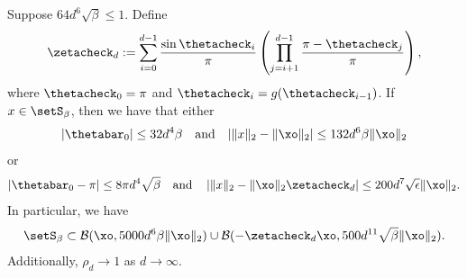 \begin{lemma} \label{lemma:Seps}
Suppose $64 d^6 \sqrt{\beta} \leq 1$. 
Define
\[
\zetacheck_d := \sum_{i=0}^{d-1} \frac{\sin \thetacheck_{i}}{\pi} \left( \prod_{j=i+1}^{d-1} \frac{\pi - \thetacheck_{j} }{\pi} \right),
\]
where $\thetacheck_0= \pi$ and $\thetacheck_i = g(\thetacheck_{i-1})$.  If $x \in \setS_\beta$, then we have that either
\[
|\thetabar_0| \leq 32 d^4 \beta \quad \text{and} \quad |\|x\|_2 - \|\xo\|_2| \leq  132 d^6 \beta \|\xo\|_2
\]
or
\[
|\thetabar_0 - \pi| 
\leq 
8\pi d^4 \sqrt{\beta}  \quad \text{and} \quad  \left| \|x\|_2 - \|\xo\|_2 \zetacheck_d \right | \leq 200 d^7 \sqrt{\epsilon} \|\xo\|_2.
\]
In particular, we have
\begin{align}
\setS_\beta \subset \mathcal{B}(\xo, 5000 d^6 \beta \|\xo\|_2  ) \cup  \mathcal{B}( -\zetacheck_d \xo, 500 d^{11} \sqrt{\beta} \|\xo\|_2).
 \label{Seps-estimate-balls}
\end{align}
Additionally, $\rho_d \to 1$ as $d \to \infty$.
\end{lemma}


